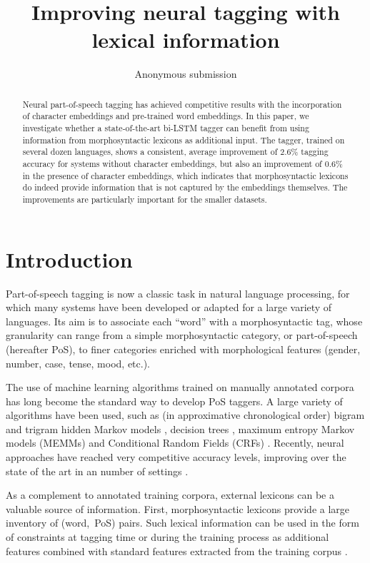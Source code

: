 \documentclass[11pt,letterpaper]{article}
\title{Improving neural tagging with lexical information}
\author{Anonymous submission}
\date{}
\begin{document}
\maketitle

\begin{abstract}
  Neural part-of-speech tagging has achieved competitive results with the incorporation of character embeddings and
  pre-trained word embeddings. In this paper, we investigate whether a state-of-the-art bi-LSTM tagger can benefit from
  using information from morphosyntactic lexicons as additional input. The tagger, trained on several dozen languages,
  shows a consistent, average improvement of 2.6\% tagging accuracy for systems without character embeddings, but also
  an improvement of 0.6\% in the presence of character embeddings, which indicates that morphosyntactic lexicons do
  indeed provide information that is not captured by the embeddings themselves. The improvements are particularly
  important for the smaller datasets.
\end{abstract}


\section{Introduction}

Part-of-speech tagging is now a classic task in natural language processing, for which many systems have been developed
or adapted for a large variety of languages. Its aim is to associate each ``word'' with a morphosyntactic tag, whose
granularity can range from a simple morphosyntactic category, or part-of-speech (hereafter PoS), to finer categories
enriched with morphological features (gender, number, case, tense, mood, etc.).

The use of machine learning algorithms trained on manually annotated corpora has long become the standard way to develop
PoS taggers. A large variety of algorithms have been used, such as (in approximative chronological order) bigram and
trigram hidden Markov models \cite{merialdo94,brants96,brants00}, decision trees \cite{schmid94,magerman95}, maximum
entropy Markov models (MEMMs) \cite{ratnaparkhi96} and Conditional Random Fields (CRFs)
\cite{lafferty01,constant12}. Recently, neural approaches have reached very competitive accuracy levels, improving over
the state of the art in an number of settings \cite{plank16}.

As a complement to  annotated training corpora, external lexicons can be a valuable source of information.
First, morphosyntactic lexicons provide a large inventory of (word,~PoS)
pairs. Such lexical information can be used in the form of constraints at tagging time \cite{kim99,hajic00tagging} or
during the training process as additional features combined with standard features extracted from the training corpus
\cite{chrupala08,goldberg09,denis12}.
\end{document}
